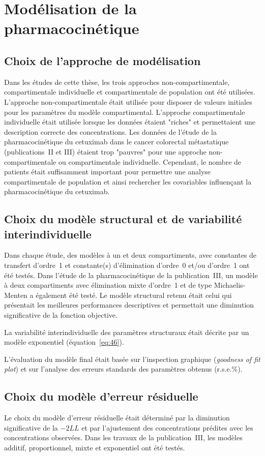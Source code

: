 \section{Modélisation de la pharmacocinétique}
\subsection{Choix de l'approche de modélisation}
Dans les études de cette thèse, les trois approches non-compartimentale, compartimentale individuelle et compartimentale de population ont été utilisées. L'approche non-compartimentale était utilisée pour disposer de valeurs initiales pour les paramètres du modèle compartimental. L'approche compartimentale individuelle était utilisée lorsque les données étaient "riches" et permettaient une description correcte des concentrations. Les données de l'étude de la pharmacocinétique du cetuximab dans le cancer colorectal métastatique (publications~II et III) étaient trop "pauvres" pour une approche non-compartimentale ou compartimentale individuelle. Cependant, le nombre de patients était suffisamment important pour permettre une analyse compartimentale de population et ainsi rechercher les covariables influençant la pharmacocinétique du cetuximab. 
\subsection{Choix du modèle structural et de variabilité interindividuelle}
Dans chaque étude, des modèles à un et deux compartiments, avec constantes de transfert d'ordre~1 et constante(s) d'élimination d'ordre~0 et/ou d'ordre~1 ont été testés. Dans l'étude de la pharmacocinétique de la publication~III, un modèle à deux compartiments avec élimination mixte d'ordre~1 et de type Michaelis-Menten a également été testé. Le modèle structural retenu était celui qui présentait les meilleures performances descriptives et permettait une diminution significative de la fonction objective.

La variabilité interindividuelle des paramètres structuraux était décrite par un modèle exponentiel (équation~\ref{eq:46}).

L'évaluation du modèle final était basée sur l'inspection graphique (\textit{goodness of fit plot})  et sur l'analyse des erreurs standards des paramètres obtenus (r.s.e.\%).
\subsection{Choix du modèle d'erreur résiduelle}
Le choix du modèle d'erreur résiduelle était déterminé par la diminution significative de la $-2LL$ et par l'ajustement des concentrations prédites avec les concentrations observées. Dans les travaux de la publication~III, les modèles additif, proportionnel, mixte et exponentiel ont été testés.

